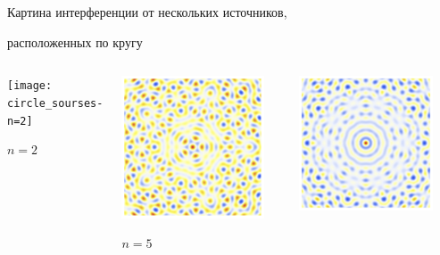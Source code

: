 \documentclass[9pt, compress, xcolor=table]{beamer}
\begin{document}
\begin{frame}{Картина интерференции от нескольких источников,}

расположенных по кругу

    \begin{columns}[c]
\column{4cm}
\begin{center}
\texttt{[image: circle\_sourses-n=2]}

$n=2$
\end{center}

\column{4cm}
\begin{center}
\includegraphics[width=0.9\textwidth]{circle_sourses-n=5}

$n=5$
\end{center}

\column{4cm}
\begin{center}
\includegraphics[width=0.85\textwidth]{circle_sourses-n=10}


\end{center}
\end{columns}
\end{frame}
\end{document}
